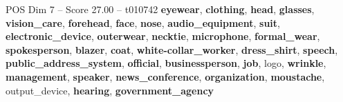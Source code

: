 \begin{textsample}{POS Dim 7 – Score 27.00 – t010742}  \label{ex:f7_pos_027}
\textbf{eyewear}, \textbf{clothing}, \textbf{head}, \textbf{glasses}, \textbf{vision\_care}, \textbf{forehead}, \textbf{face}, \textbf{nose}, \textbf{audio\_equipment}, \textbf{suit}, \textbf{electronic\_device}, \textbf{outerwear}, \textbf{necktie}, \textbf{microphone}, \textbf{formal\_wear}, \textbf{spokesperson}, \textbf{blazer}, \textbf{coat}, \textbf{white-collar\_worker}, \textbf{dress\_shirt}, \textbf{speech}, \textbf{public\_address\_system}, \textbf{official}, \textbf{businessperson}, \textbf{job}, logo, \textbf{wrinkle}, \textbf{management}, \textbf{speaker}, \textbf{news\_conference}, \textbf{organization}, \textbf{moustache}, output\_device, \textbf{hearing}, \textbf{government\_agency}

\end{textsample}

